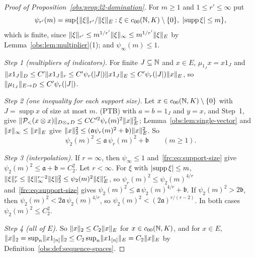 \begin{proof}[Proof of Proposition~\ref{obs:prop:l2-domination}]
For $m\ge1$ and $1\le r'\le\infty$ put
\[
 \psi_{r'}(m)=\sup\{\lVert \xi\rVert_{r'}/\lVert \xi\rVert_E:\xi\in c_{00}(\mathbb N,K)\setminus\{0\},\ \lvert \operatorname{supp}\xi\rvert\le m\},
\]
which is finite, since $\lVert \xi\rVert_{r'}\le m^{1/r'}\lVert \xi\rVert_\infty\le m^{1/r'}\lVert \xi\rVert_E$ by
Lemma~\ref{obs:lem:multiplier}(1); and $\psi_\infty(m)\le1$.

\emph{Step 1 (multipliers of indicators).} For finite $J\subseteq\mathbb N$ and $x\in E$, $\mu_{1_J}x=x1_J$ and
$\lVert x1_J\rVert_D\le C'\lVert x1_J\rVert_r\le C'\psi_r(\lvert J\rvert)\lVert x1_J\rVert_E\le C'\psi_r(\lvert J\rvert)\lVert x\rVert_E$, so
$\lVert \mu_{1_J}\rVert_{E\to D}\le C'\psi_r(\lvert J\rvert)$.

\emph{Step 2 (one inequality for each support size).} Let $x\in c_{00}(\mathbb N,K)\setminus\{0\}$ with $J=\operatorname{supp}x$
of size at most $m$. \textup{(PTB)} with $a=b=1_J$ and $y=x$, and Step~1, give
$\lVert \mathcal P_<(x\otimes x)\rVert_{D\otimes_\pi D}\le CC'^2\psi_r(m)^2\lVert x\rVert_E^2$; Lemma~\ref{obs:lem:single-vector} and
$\lVert x\rVert_\infty\le\lVert x\rVert_E$ give $\lVert x\rVert_2^2\le(\mathfrak a\psi_r(m)^2+\mathfrak b)\lVert x\rVert_E^2$. So
\begin{equation}\label{frc:eq:support-size}
 \psi_2(m)^2\le\mathfrak a\,\psi_r(m)^2+\mathfrak b\qquad(m\ge1).
\end{equation}

\emph{Step 3 (interpolation).} If $r=\infty$, then $\psi_\infty\le1$ and~\eqref{frc:eq:support-size} give
$\psi_2(m)^2\le\mathfrak a+\mathfrak b=C_2^2$. Let $r<\infty$. For $\xi$ with $\lvert \operatorname{supp}\xi\rvert\le m$,
$\lVert \xi\rVert_r^r\le\lVert \xi\rVert_\infty^{r-2}\lVert \xi\rVert_2^2\le\psi_2(m)^2\lVert \xi\rVert_E^r$, so $\psi_r(m)^2\le\psi_2(m)^{4/r}$
and~\eqref{frc:eq:support-size} gives $\psi_2(m)^2\le\mathfrak a\,\psi_2(m)^{4/r}+\mathfrak b$. If
$\psi_2(m)^2>2\mathfrak b$, then $\psi_2(m)^2<2\mathfrak a\,\psi_2(m)^{4/r}$, so $\psi_2(m)^2<(2\mathfrak a)^{r/(r-2)}$.
In both cases $\psi_2(m)^2\le C_2^2$.

\emph{Step 4 (all of $E$).} So $\lVert x\rVert_2\le C_2\lVert x\rVert_E$ for $x\in c_{00}(\mathbb N,K)$, and for $x\in E$,
$\lVert x\rVert_2=\sup_n\lVert x1_{[n]}\rVert_2\le C_2\sup_n\lVert x1_{[n]}\rVert_E=C_2\lVert x\rVert_E$ by
Definition~\ref{obs:def:sequence-spaces}.
\end{proof}

